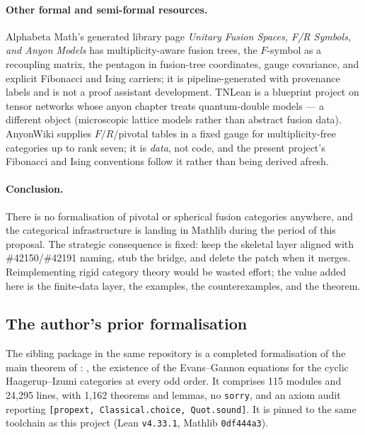 \documentclass[11pt,a4paper]{article}
\theoremstyle{remark}
\newcommand{\code}[1]{\texttt{\detokenize{#1}}}
\begin{document}
\paragraph{Other formal and semi-formal resources.}
Alphabeta Math's generated library page \emph{Unitary Fusion Spaces, F/R Symbols, and Anyon
Models} \cite{Alphabeta} has multiplicity-aware fusion trees, the $F$-symbol as a recoupling
matrix, the pentagon in fusion-tree coordinates, gauge covariance, and explicit Fibonacci and
Ising carriers; it is pipeline-generated with provenance labels and is not a proof assistant
development. TNLean \cite{TNLean} is a blueprint project on tensor networks whose anyon chapter
treats quantum-double models --- a different object (microscopic lattice models rather than
abstract fusion data). AnyonWiki \cite{AnyonWiki} supplies $F/R$/pivotal tables in a fixed gauge
for multiplicity-free categories up to rank seven; it is \emph{data}, not code, and the present
project's Fibonacci and Ising conventions follow it rather than being derived afresh.

\paragraph{Conclusion.}
There is no formalisation of pivotal or spherical fusion categories anywhere, and the
categorical infrastructure is landing in Mathlib during the period of this proposal. The
strategic consequence is fixed: keep the skeletal layer aligned with \#42150/\#42191 naming,
stub the bridge, and delete the patch when it merges. Reimplementing rigid category theory
would be wasted effort; the value added here is the finite-data layer, the examples, the
counterexamples, and the theorem.

\subsection{The author's prior formalisation}\label{sec:haagerup}

The sibling package \code{haagerup-odd/} in the same repository is a completed formalisation of
the main theorem of \cite{Huang2609}: \code{exists_EGEquations_odd}, the existence of the
Evans--Gannon equations for the cyclic Haagerup--Izumi categories at every odd order.
It comprises 115 modules and 24{,}295 lines, with 1{,}162 theorems and lemmas, no
\texttt{sorry}, and an axiom audit reporting \texttt{[propext, Classical.choice, Quot.sound]}.
It is pinned to the same toolchain as this project (Lean \texttt{v4.33.1}, Mathlib
\texttt{0df444a3}).
\end{document}
